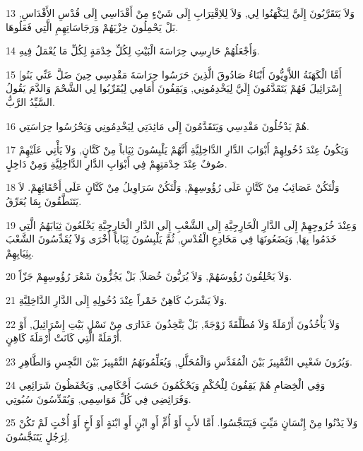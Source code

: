 \par 13 وَلاَ يَتَقَرَّبُونَ إِلَيَّ لِيَكْهَنُوا لِي, وَلاَ لِلاِقْتِرَابِ إِلَى شَيْءٍ مِنْ أَقْدَاسِي إِلَى قُدْسِ الأَقْدَاسِ, بَلْ يَحْمِلُونَ خِزْيَهُمْ وَرَجَاسَاتِهِمِ الَّتِي فَعَلُوهَا.
\par 14 وَأَجْعَلُهُمْ حَارِسِي حِرَاسَةَ الْبَيْتِ لِكُلِّ خِدْمَةٍ لِكُلِّ مَا يُعْمَلُ فِيهِ.
\par 15 [أَمَّا الْكَهَنَةُ اللاَّوِيُّونَ أَبْنَاءُ صَادُوقَ الَّذِينَ حَرَسُوا حِرَاسَةَ مَقْدِسِي حِينَ ضَلَّ عَنِّي بَنُو إِسْرَائِيلَ فَهُمْ يَتَقَدَّمُونَ إِلَيَّ لِيَخْدِمُونِي, وَيَقِفُونَ أَمَامِي لِيُقَرِّبُوا لِي الشَّحْمَ وَالدَّمَ يَقُولُ السَّيِّدُ الرَّبُّ.
\par 16 هُمْ يَدْخُلُونَ مَقْدِسِي وَيَتَقَدَّمُونَ إِلَى مَائِدَتِي لِيَخْدِمُونِي وَيَحْرُسُوا حِرَاسَتِي.
\par 17 وَيَكُونُ عِنْدَ دُخُولِهِمْ أَبْوَابَ الدَّارِ الدَّاخِلِيَّةِ أَنَّهُمْ يَلْبِسُونَ ثِيَاباً مِنْ كَتَّانٍ, وَلاَ يَأْتِي عَلَيْهِمْ صُوفٌ عِنْدَ خِدْمَتِهِمْ فِي أَبْوَابِ الدَّارِ الدَّاخِلِيَّةِ وَمِنْ دَاخِلٍ.
\par 18 وَلْتَكُنْ عَصَائِبُ مِنْ كَتَّانٍ عَلَى رُؤُوسِهِمْ, وَلْتَكُنْ سَرَاوِيلُ مِنْ كَتَّانٍ عَلَى أَحْقَائِهِمْ. لاَ يَتَنَطَّقُونَ بِمَا يُعَرِّقُ.
\par 19 وَعِنْدَ خُرُوجِهِمْ إِلَى الدَّارِ الْخَارِجِيَّةِ إِلَى الشَّعْبِ إِلَى الدَّارِ الْخَارِجِيَّةِ يَخْلَعُونَ ثِيَابَهُمُ الَّتِي خَدَمُوا بِهَا, وَيَضَعُونَهَا فِي مَخَادِعِ الْقُدْسِ, ثُمَّ يَلْبِسُونَ ثِيَاباً أُخْرَى وَلاَ يُقَدِّسُونَ الشَّعْبَ بِثِيَابِهِمْ.
\par 20 وَلاَ يَحْلِقُونَ رُؤُوسَهُمْ, وَلاَ يُرَبُّونَ خُصَلاً, بَلْ يَجُزُّونَ شَعْرَ رُؤُوسِهِمْ جَزّاً.
\par 21 وَلاَ يَشْرَبُ كَاهِنٌ خَمْراً عِنْدَ دُخُولِهِ إِلَى الدَّارِ الدَّاخِلِيَّةِ.
\par 22 وَلاَ يَأْخُذُونَ أَرْمَلَةً وَلاَ مُطَلَّقَةً زَوْجَةً, بَلْ يَتَّخِذُونَ عَذَارَى مِنْ نَسْلِ بَيْتِ إِسْرَائِيلَ, أَوْ أَرْمَلَةً الَّتِي كَانَتْ أَرْمَلَةَ كَاهِنٍ.
\par 23 وَيُرُونَ شَعْبِي التَّمْيِيزَ بَيْنَ الْمُقَدَّسِ وَالْمُحَلَّلِ, وَيُعَلِّمُونَهُمُ التَّمْيِيزَ بَيْنَ النَّجِسِ وَالطَّاهِرِ.
\par 24 وَفِي الْخِصَامِ هُمْ يَقِفُونَ لِلْحُكْمِ وَيَحْكُمُونَ حَسَبَ أَحْكَامِي, وَيَحْفَظُونَ شَرَائِعِي وَفَرَائِضِي فِي كُلِّ مَوَاسِمِي, وَيُقَدِّسُونَ سُبُوتِي.
\par 25 وَلاَ يَدْنُوا مِنْ إِنْسَانٍ مَيِّتٍ فَيَتَنَجَّسُوا. أَمَّا لأَبٍ أَوْ أُمٍّ أَوِ ابْنٍ أَوِ ابْنَةٍ أَوْ أَخٍ أَوْ أُخْتٍ لَمْ تَكُنْ لِرَجُلٍ يَتَنَجَّسُونَ.
